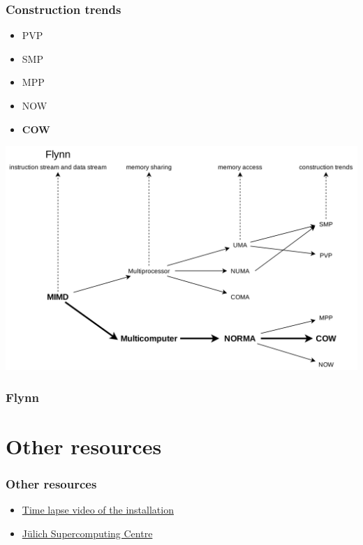 \documentclass{beamer}
\begin{document}
\begin{frame}
  \frametitle{Construction trends}
  \begin{itemize}
    \item PVP
    \item SMP
    \item MPP
    \item NOW
    \item \textbf{COW}
  \end{itemize}

\end{frame}

\begin{frame}
  \includegraphics[width=\textwidth]{./images/classifications.png}
\end{frame}

\begin{frame}
  \frametitle{Flynn}
\end{frame}


\section{Other resources}

\begin{frame}
  \frametitle{Other resources}
  \begin{itemize}
    \item \href{https://www.youtube.com/watch?v=7h6mYU2HDTA}{Time lapse video of the installation}
    \item \href{https://www.fz-juelich.de/ias/jsc/EN/Home/home_node.html}{Jülich Supercomputing Centre}
  \end{itemize}
\end{frame}
\end{document}
